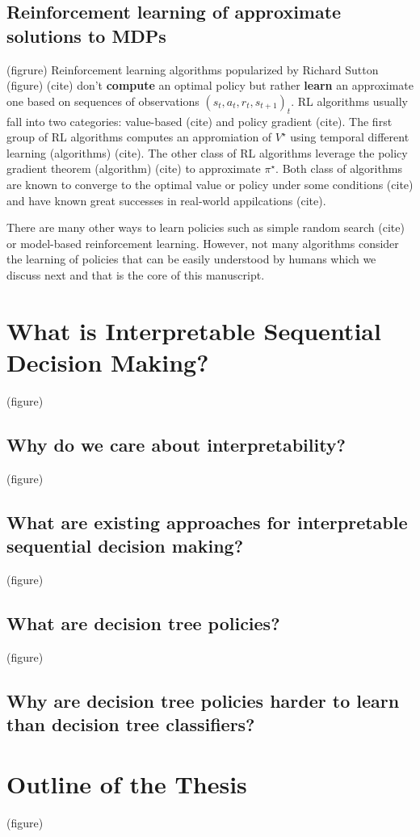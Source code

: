\subsection{Reinforcement learning of approximate solutions to MDPs}
(figrure)
Reinforcement learning algorithms popularized by Richard Sutton (figure) (cite) don't \textbf{compute} an optimal policy but rather \textbf{learn} an approximate one based on sequences of observations ${(s_t, a_t, r_t, s_{t+1})}_t$.
RL algorithms usually fall into two categories: value-based (cite) and policy gradient (cite). The first group of RL algorithms computes an appromiation of $V^{\star}$ using temporal different learning (algorithms) (cite). The other class of RL algorithms leverage the policy gradient theorem (algorithm) (cite) to approximate $\pi^{\star}$.
Both class of algorithms are known to converge to the optimal value or policy under some conditions (cite) and have known great successes in real-world appilcations (cite).

There are many other ways to learn policies such as simple random search (cite) or model-based reinforcement learning. However, not many algorithms consider the learning of policies that can be easily understood by humans which we discuss next and that is the core of this manuscript.
\section{What is Interpretable Sequential Decision Making?}
(figure)
\subsection{Why do we care about interpretability?}
(figure)

\subsection{What are existing approaches for interpretable sequential decision making?}
(figure)

\subsection{What are decision tree policies?}
(figure)

\subsection{Why are decision tree policies harder to learn than decision tree classifiers?}

\section{Outline of the Thesis}
(figure)
